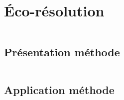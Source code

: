 \documentclass{beamer}
\begin{document}
    \section{Éco-résolution}
        \begin{frame}
            \begin{columns}[t]
  				\begin{column}{5cm}
  					\tableofcontents[sections={1-4}, currentsection]
  				\end{column}
  				\begin{column}{5cm}
  					\tableofcontents[sections={5-8}, currentsection]
  				\end{column}
  			\end{columns}
        \end{frame}
        \subsection{Présentation méthode}
            \begin{frame}
                \begin{columns}[t]
                    \begin{column}{5cm}
                        \tableofcontents[sections={1-4}, currentsubsection, currentsection]
                    \end{column}
                    \begin{column}{5cm}
                        \tableofcontents[sections={5-8}, currentsubsection, currentsection]
                    \end{column}
                \end{columns}
            \end{frame}
	        
	    \subsection{Application méthode}
            \begin{frame}
                \begin{columns}[t]
                    \begin{column}{5cm}
                        \tableofcontents[sections={1-4}, currentsubsection, currentsection]
                    \end{column}
                    \begin{column}{5cm}
                        \tableofcontents[sections={5-8}, currentsubsection, currentsection]
                    \end{column}
                \end{columns}
            \end{frame}
        	
\end{document}
